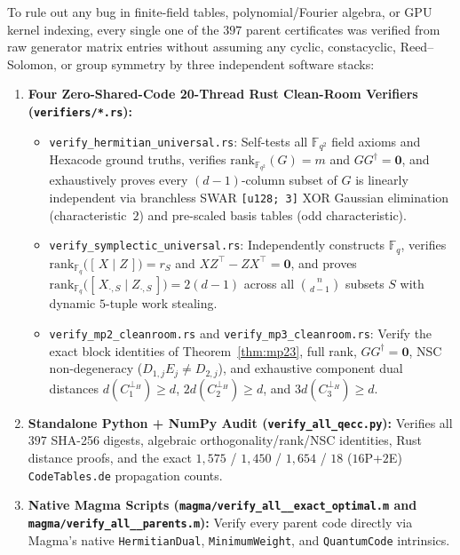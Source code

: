 \documentclass[11pt,a4paper]{article}
\newcommand{\vb}[1]{\symbf{#1}}
\newcommand{\vb}[1]{\mathbf{#1}}
\theoremstyle{remark}
\begin{document}
To rule out any bug in finite-field tables, polynomial/Fourier algebra, or GPU kernel indexing, every single one of the $397$ parent certificates was verified from raw generator matrix entries without assuming any cyclic, constacyclic, Reed--Solomon, or group symmetry by three independent software stacks:
\begin{enumerate}\small\setlength{\itemsep}{2pt}
  \item \textbf{Four Zero-Shared-Code 20-Thread Rust Clean-Room Verifiers (\texttt{verifiers/*.rs}):}
  \begin{itemize}\setlength{\itemsep}{1.5pt}
    \item \texttt{verify\_hermitian\_universal.rs}: Self-tests all $\mathbb{F}_{q^2}$ field axioms and Hexacode ground truths, verifies $\mathrm{rank}_{\mathbb{F}_{q^2}}(G) = m$ and $G G^\dagger = \vb{0}$, and exhaustively proves every $(d - 1)$-column subset of $G$ is linearly independent via branchless SWAR \texttt{[u128; 3]} XOR Gaussian elimination (characteristic~$2$) and pre-scaled basis tables (odd characteristic).
    \item \texttt{verify\_symplectic\_universal.rs}: Independently constructs $\mathbb{F}_q$, verifies $\mathrm{rank}_{\mathbb{F}_q}\!\bigl([\,X \;\big|\; Z\,]\bigr) = r_S$ and $X Z^\top - Z X^\top = \vb{0}$, and proves $\mathrm{rank}_{\mathbb{F}_q}\!\bigl([\,X_{\cdot, S} \;\big|\; Z_{\cdot, S}\,]\bigr) = 2(d - 1)$ across all $\binom{n}{d-1}$ subsets $S$ with dynamic $5$-tuple work stealing.
    \item \texttt{verify\_mp2\_cleanroom.rs} and \texttt{verify\_mp3\_cleanroom.rs}: Verify the exact block identities of Theorem~\ref{thm:mp23}, full rank, $G G^\dagger = \vb{0}$, NSC non-degeneracy ($D_{1,j} E_j \ne D_{2,j}$), and exhaustive component dual distances $d(C_1^{\perp_H}) \ge d$, $2d(C_2^{\perp_H}) \ge d$, and $3d(C_3^{\perp_H}) \ge d$.
  \end{itemize}
  \item \textbf{Standalone Python + NumPy Audit (\texttt{verify\_all\_qecc.py}):} Verifies all $397$ SHA-256 digests, algebraic orthogonality/rank/NSC identities, Rust distance proofs, and the exact $1{,}575$ / $1{,}450$ / $1{,}654$ / $18$ ($16$P+$2$E) \texttt{CodeTables.de} propagation counts.
  \item \textbf{Native Magma Scripts (\texttt{magma/\allowbreak verify\_\allowbreak all\_\_\allowbreak exact\_\allowbreak optimal.m} and \texttt{magma/\allowbreak verify\_\allowbreak all\_\_\allowbreak parents.m}):} Verify every parent code directly via Magma's native \texttt{HermitianDual}, \texttt{MinimumWeight}, and \texttt{QuantumCode} intrinsics.
\end{enumerate}
\end{document}
